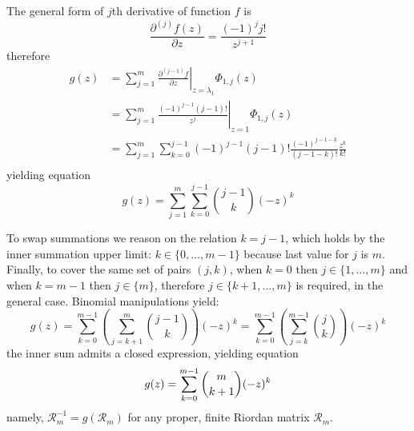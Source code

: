 
The general form of $j$th derivative of function $f$ is 
$$\frac{\partial^{(j)}{f}(z)}{\partial{z}} = \frac{(-1)^{j}j!}{z^{j+1}}$$ 
therefore
\begin{displaymath}
\begin{split}
  g(z) &= \sum_{j=1}^{m}{ \left. \frac{\partial^{(j-1)}{f}}{\partial{z}} \right|_{z=\lambda_{1}}\Phi_{1,j}(z)} \\
       &= \sum_{j=1}^{m}{ \left. \frac{(-1)^{j-1}(j-1)!}{z^{j}} \right|_{z=1}\Phi_{1,j}(z)} \\
       &= \sum_{j=1}^{m}{\sum_{k=0}^{j-1}{(-1)^{j-1}(j-1)!\frac{(-1)^{j-1-k}}{(j-1-k)!}\frac{z^{k}}{k!}}} \\
\end{split}
\end{displaymath}
yielding equation
\begin{equation}
  g(z) = \sum_{j=1}^{m}{\sum_{k=0}^{j-1}{{{j-1}\choose{k}}(-z)^{k}}} 
\end{equation}

To swap summations we reason on the relation $k=j-1$, which holds by the inner summation upper limit:
$k\in \lbrace 0,\ldots,m-1 \rbrace$ because last value for $j$ is $m$. Finally, to cover the same set 
of pairs $(j, k)$, when $k=0$ then $j\in \lbrace 1,\ldots,m \rbrace$ and when $k=m-1$ then 
$j\in \lbrace m \rbrace$, therefore $j\in \lbrace k+1, \ldots, m \rbrace$ is required, in the general case.
Binomial manipulations yield:
\begin{displaymath}
  g(z) = \sum_{k=0}^{m-1}{\left(\sum_{j=k+1}^{m}{{{j-1}\choose{k}}}\right)(-z)^{k}}
       = \sum_{k=0}^{m-1}{\left(\sum_{j=k}^{m-1}{{{j}\choose{k}}}\right)(-z)^{k}}
\end{displaymath}
the inner sum admits a closed expression, yielding equation
\begin{equation}
  g(z) = \sum_{k=0}^{m-1}{{{m}\choose{k+1}}(-z)^{k}} \\
\end{equation}
namely, $\mathcal{R}_{m}^{-1}=g(\mathcal{R}_{m})$ for any proper, finite Riordan matrix $\mathcal{R}_{m}$.

\iffalse
Polynomial $g$ can also be written in closed form, assuming convergence condition $|z|\leq 1$:
\begin{displaymath}
g(z) = \frac{1- \left(1- z \right)^{m} }{z}
\end{displaymath}
\fi

